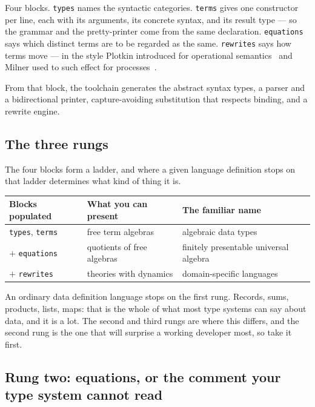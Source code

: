 Four blocks. \texttt{types} names the syntactic categories. \texttt{terms} gives
one constructor per line, each with its arguments, its concrete syntax, and its
result type --- so the grammar and the pretty-printer come from the same
declaration. \texttt{equations} says which distinct terms are to be regarded as
the same. \texttt{rewrites} says how terms move --- in the style Plotkin introduced for
operational semantics~\cite{Plotkin81} and Milner used to such effect for
processes~\cite{Milner92}.

From that block, the toolchain generates the abstract syntax types, a parser and
a bidirectional printer, capture-avoiding substitution that respects binding,
and a rewrite engine.

\subsection{The three rungs}

The four blocks form a ladder, and where a given language definition stops on
that ladder determines what kind of thing it is.

\begin{center}
\small
\begin{tabular}{@{}L{0.26\textwidth}L{0.32\textwidth}L{0.32\textwidth}@{}}
\toprule
\textbf{Blocks populated} & \textbf{What you can present} & \textbf{The familiar name} \\
\midrule
\texttt{types}, \texttt{terms} &
free term algebras &
algebraic data types \\[3pt]
$+$ \texttt{equations} &
quotients of free algebras &
finitely presentable universal algebra \\[3pt]
$+$ \texttt{rewrites} &
theories with dynamics &
domain-specific languages \\
\bottomrule
\end{tabular}
\end{center}

An ordinary data definition language stops on the first rung. Records, sums,
products, lists, maps: that is the whole of what most type systems can say about
data, and it is a lot. The second and third rungs are where this differs, and
the second rung is the one that will surprise a working developer most, so take
it first.

\subsection{Rung two: equations, or the comment your type system cannot read}


